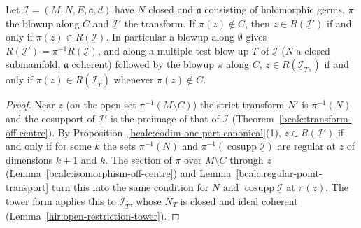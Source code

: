 \begin{lemma}
\label{bcalc:codim-one-part-off-centre}
\mixedleanok
Let \(\underline{\mathcal I}=(M,N,E,\mathfrak a,d)\) have \(N\) closed and \(\mathfrak a\) consisting of holomorphic germs, \(\pi\) the blowup along \(C\) and
\(\underline{\mathcal I}'\) the transform. If \(\pi(z)\notin C\), then \(z\in R(\underline{\mathcal I}')\) if and only if \(\pi(z)\in R(\underline{\mathcal I})\). In particular a
blowup along \(\emptyset\) gives \(R(\underline{\mathcal I}')=\pi^{-1}R(\underline{\mathcal I})\), and along a multiple test blow-up \(T\) of \(\underline{\mathcal I}\) (\(N\) a
closed submanifold, \(\mathfrak a\) coherent) followed by the blowup \(\pi\) along \(C\), \(z\in R(\underline{\mathcal I}_{T\pi})\) if and only if
\(\pi(z)\in R(\underline{\mathcal I}_T)\) whenever \(\pi(z)\notin C\).
\end{lemma}
\begin{proof}
\mixedleanok
Near \(z\) (on the open set \(\pi^{-1}(M\setminus C)\)) the strict transform \(N'\) is \(\pi^{-1}(N)\) and the cosupport of \(\underline{\mathcal I}'\) is the preimage of
that of \(\underline{\mathcal I}\) (Theorem~\ref{bcalc:transform-off-centre}). By Proposition~\ref{bcalc:codim-one-part-canonical}(1), \(z\in R(\underline{\mathcal I}')\) if and only
if for some \(k\) the sets \(\pi^{-1}(N)\) and \(\pi^{-1}(\operatorname{cosupp}\underline{\mathcal I})\) are regular at \(z\) of dimensions \(k+1\) and \(k\). The section of
\(\pi\) over \(M\setminus C\) through \(z\) (Lemma~\ref{bcalc:isomorphism-off-centre}) and Lemma~\ref{bcalc:regular-point-transport} turn this into the same condition for
\(N\) and \(\operatorname{cosupp}\underline{\mathcal I}\) at \(\pi(z)\). The tower form applies this to \(\underline{\mathcal I}_T\), whose \(N_T\) is closed and ideal
coherent (Lemma~\ref{hir:open-restriction-tower}).
\end{proof}

